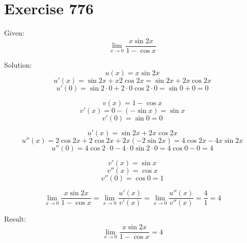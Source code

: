 \documentclass[a4paper, 10pt]{scrartcl}
\begin{document}
\section{Exercise 776}

Given:
\[
\lim_{x\to 0}{\frac{x\sin{2x}}{1 - \cos{x}}}
\]

Solution:
\[
u(x) = x\sin{2x}
\]
\[
u'(x) = \sin{2x} + x2\cos{2x} = \sin{2x} + 2x\cos{2x}
\]
\[
u'(0) = \sin{2\cdot 0} + 2\cdot 0\cos{2\cdot 0} = \sin{0} + 0 = 0
\]

\[
v(x) = 1 - \cos{x}
\]
\[
v'(x) = 0 - (-\sin{x}) = \sin{x}
\]
\[
v'(0) = \sin{0} = 0
\]

\[
u'(x) = \sin{2x} + 2x\cos{2x}
\]
\[
u''(x) = 2\cos{2x} + 2\cos{2x} + 2x(-2\sin{2x}) = 4\cos{2x} - 4x\sin{2x}
\]
\[
u''(0) = 4\cos{2\cdot 0} - 4\cdot 0\sin{2\cdot 0} = 4\cos{0} - 0 = 4
\]

\[
v'(x) = \sin{x}
\]
\[
v''(x) = \cos{x}
\]
\[
v''(0) = \cos{0} = 1
\]

\[
\lim_{x\to 0}{\frac{x\sin{2x}}{1 - \cos{x}}} =
\lim_{x\to 0}{\frac{u'(x)}{v'(x)}} =
\lim_{x\to 0}{\frac{u''(x)}{v''(x)}} =
\frac{4}{1} =
4
\]

Result:
\[
\lim_{x\to 0}{\frac{x\sin{2x}}{1 - \cos{x}}} = 4
\]
\end{document}
